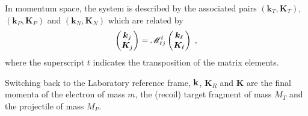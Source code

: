 In momentum space, the system is described by the associated pairs $(\bm{k}_T, \bm{K}_T)$, $(\bm{k}_P, \bm{K}_P)$ and $(\bm{k}_N,\bm{K}_N)$ which are related by
\[
\left( \begin{matrix} \bm{k}_j \cr \bm{K}_j \cr \end{matrix} \right) = {\cal M}^t_{\ell j} \left( \begin{matrix} \bm{k}_\ell \cr \bm{K}_\ell \cr
  \end{matrix}
\right) \; ,
\]
where the superscript $t$ indicates the transposition of the matrix elements.

Switching back to the Laboratory reference frame, $\bf k$, $\bm{K}_R$ and $\bm{K}$ are the final momenta of the electron of mass $m$, the (recoil) target fragment of mass $M_T$ and the projectile of mass $M_P$.

